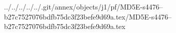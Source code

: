 ../../../../../.git/annex/objects/j1/pf/MD5E-s4476--b27c7527076bdfb75dc3f23befe9d69a.tex/MD5E-s4476--b27c7527076bdfb75dc3f23befe9d69a.tex